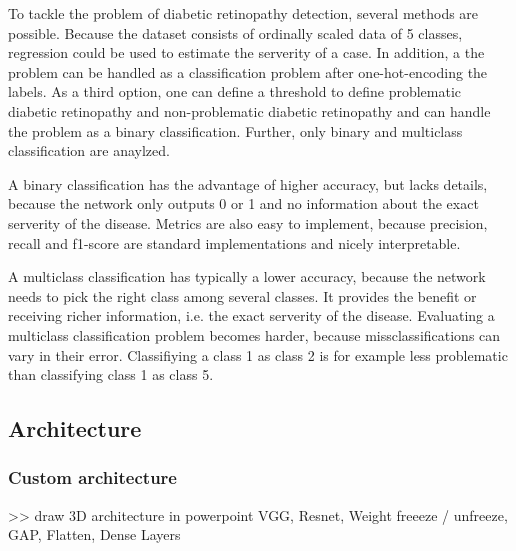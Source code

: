 \documentclass{article}
\begin{document}
To tackle the problem of diabetic retinopathy detection, several methods are possible. Because the dataset consists of 
ordinally scaled data of 5 classes, regression could be used to estimate the serverity of a case. In addition, a the problem 
can be handled as a classification problem after one-hot-encoding the labels. As a third option, one can define a threshold 
to define problematic diabetic retinopathy and non-problematic diabetic retinopathy and can handle the problem as a binary 
classification. Further, only binary and multiclass classification are anaylzed.

A binary classification has the advantage of higher accuracy, but lacks details, because the network only outputs 0 or 1
and no information about the exact serverity of the disease. Metrics are also easy to implement, because precision, 
recall and f1-score are standard implementations and nicely interpretable.

A multiclass classification has typically a lower accuracy, because the network needs to pick the right class among 
several classes. It provides the benefit or receiving richer information, i.e. the exact serverity of the disease.
Evaluating a multiclass classification problem becomes harder, because missclassifications can vary in their error.
Classifiying a class 1 as class 2 is for example less problematic than classifying class 1 as class 5.


\subsection{Architecture}
\subsubsection{Custom architecture}
>> draw 3D architecture in powerpoint
VGG, Resnet, Weight freeeze / unfreeze, GAP, Flatten, Dense Layers
\end{document}
